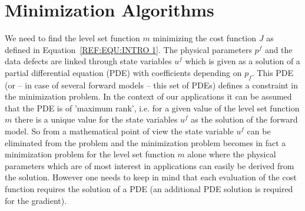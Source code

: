 
%
%
%

\chapter{Minimization Algorithms}\label{chapter:ref:Minimization}
We need to find the level set function $m$ minimizing the cost function $J$ as 
defined in Equation~\ref{REF:EQU:INTRO 1}. The physical parameters $p^f$ and
the data defects are linked through state variables $u^f$ which is given as a
solution of a partial differential equation (PDE) with coefficients depending
on $p_f$. This PDE (or -- in case of several forward models -- this set of PDEs)
defines a constraint in the minimization problem.
In the context of our applications it can be assumed that the PDE is of
'maximum rank', i.e. for a given value of the level set function $m$ there is a
unique value for the state variables $u^f$ as the solution of the forward model.
So from a mathematical point of view the state variable $u^f$ can be eliminated
from the problem and the minimization problem becomes in fact a minimization
problem for the level set function $m$ alone where the physical parameters
which are of most interest in applications can easily be derived from the
solution. However one needs to keep in mind that each evaluation of the cost
function requires the solution of a PDE (an additional PDE solution is required
for the gradient).

